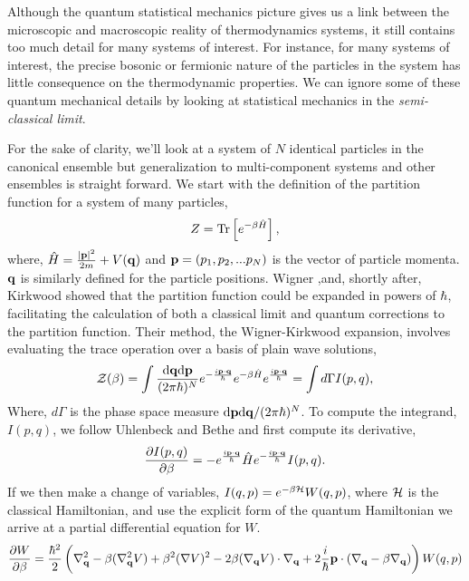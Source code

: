 Although the quantum statistical mechanics picture gives us a link between the
microscopic and macroscopic reality of thermodynamics systems, it still
contains too much detail for many systems of interest.  For instance, for many
systems of interest, the precise bosonic or fermionic nature of the particles
in the system has little consequence on the thermodynamic properties.  We can
ignore some of these quantum mechanical details by looking at statistical
mechanics in the \textit{semi-classical limit}.

For the sake of clarity, we'll look at a system of $N$ identical particles in
the canonical ensemble but generalization to multi-component systems and other
ensembles is straight forward.  We start with the definition of the partition
function for a system of many particles,  
%
\begin{equation} Z = \mathrm{Tr}\left[ e^{-\beta\hat{H}} \right], \end{equation} 
%
where, $\hat{H} = \frac{\vert\mathbf{p}\vert^2}{2m} + V(\mathbf{q})$ and $\mathbf{p} = (p_1, p_2, ...p_N)$
is the vector of particle momenta.  $\mathbf{q}$ is similarly defined for the particle
positions.  Wigner \cite{PhysRev.40.749},and, shortly after, Kirkwood
\cite{PhysRev.44.31} showed that the partition function could be expanded in
powers of $\hbar$, facilitating the calculation of both a classical limit and
quantum corrections to the partition function.  Their method, the
Wigner-Kirkwood expansion, involves evaluating the trace operation over a basis
of plain wave solutions,
%
\begin{equation} \mathcal{Z}(\beta) = \int \frac{\mathrm{d}\mathbf{q} \mathrm{d}\mathbf{p}}{(2\pi \hbar)^N}
e^{-\frac{i\mathbf{p}\cdot\mathbf{q}}{\hbar}} e^{-\beta \hat{H}} e^{\frac{i\mathbf{p}\cdot\mathbf{q}}{\hbar}} =
\int d\Gamma I(p, q), \end{equation}
%
Where, $d\Gamma$ is the phase space measure
$\mathrm{d}\mathbf{p}\mathrm{d}\mathbf{q}/(2\pi\hbar)^N$.  To compute the integrand, $I(p, q)$,
we follow Uhlenbeck and Bethe \cite{Uhlenbeck1936729} and first compute its
derivative,
%
\begin{equation} \frac{\partial I(p, q)}{\partial \beta} = -e^{\frac{i\mathbf{p}\cdot\mathbf{q}}{\hbar}}\hat{H}e^{-\frac{i\mathbf{p}\cdot\mathbf{q}}{\hbar}}
I(p, q).  \end{equation}
%
If we then make a change of variables, $I(q, p) = e^{-\beta\mathcal{H}}W(q, p)$, where
$\mathcal{H}$ is the classical Hamiltonian, and use the explicit form of the quantum
Hamiltonian we arrive at a partial differential equation for $W$.
%
\begin{equation} \frac{\partial W}{\partial \beta} = \frac{\hbar^2}{2} \left(
\nabla_{\mathbf{q}}^2 - \beta(\nabla_{\mathbf{q}}^2V) + \beta^2(\nabla V)^2 -
2\beta(\nabla_{\mathbf{q}} V)\cdot\nabla_{\mathbf{q}} + 2 \frac{i}{\hbar}\mathbf{p}\cdot(\nabla_{\mathbf{q}} -
\beta\nabla_{\mathbf{q}}) \right)W(q, p) \end{equation}
